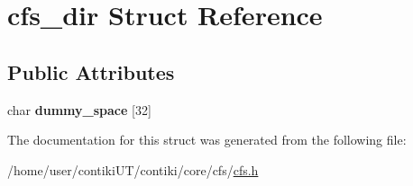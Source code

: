 \hypertarget{structcfs__dir}{}\section{cfs\+\_\+dir Struct Reference}
\label{structcfs__dir}
\subsection*{Public Attributes}
\begin{DoxyCompactItemize}
\item 
\hypertarget{structcfs__dir_a086c610d05541e2830c301f67fec4730}{}char {\bfseries dummy\+\_\+space} \mbox{[}32\mbox{]}\label{structcfs__dir_a086c610d05541e2830c301f67fec4730}

\end{DoxyCompactItemize}


The documentation for this struct was generated from the following file\+:\begin{DoxyCompactItemize}
\item 
/home/user/contiki\+U\+T/contiki/core/cfs/\hyperlink{cfs_8h}{cfs.\+h}\end{DoxyCompactItemize}
